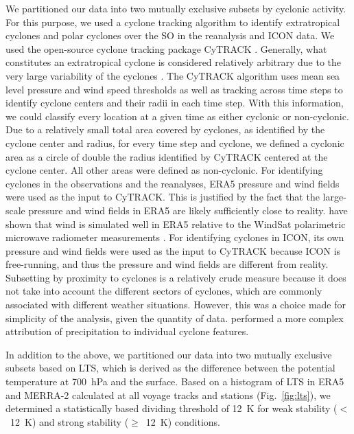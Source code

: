 \documentclass[draft]{agujournal2019}
\begin{document}
We partitioned our data into two mutually exclusive subsets by cyclonic activity. For this purpose, we used a cyclone tracking algorithm to identify extratropical cyclones and polar cyclones over the SO in the reanalysis and ICON data. We used the open-source cyclone tracking package CyTRACK \cite{perez-alarcon2024}. Generally, what constitutes an extratropical cyclone is considered relatively arbitrary due to the very large variability of the cyclones \cite{neu2013}. The CyTRACK algorithm uses mean sea level pressure and wind speed thresholds as well as tracking across time steps to identify cyclone centers and their radii in each time step. With this information, we could classify every location at a given time as either cyclonic or non-cyclonic. Due to a relatively small total area covered by cyclones, as identified by the cyclone center and radius, for every time step and cyclone, we defined a cyclonic area as a circle of double the radius identified by CyTRACK centered at the cyclone center. All other areas were defined as non-cyclonic. For identifying cyclones in the observations and the reanalyses, ERA5 pressure and wind fields were used as the input to CyTRACK. This is justified by the fact that the large-scale pressure and wind fields in ERA5 are likely sufficiently close to reality.  have shown that wind is simulated well in ERA5 relative to the WindSat polarimetric microwave radiometer measurements \cite{meissner2009}. For identifying cyclones in ICON, its own pressure and wind fields were used as the input to CyTRACK because ICON is free-running, and thus the pressure and wind fields are different from reality. Subsetting by proximity to cyclones is a relatively crude measure because it does not take into account the different sectors of cyclones, which are commonly associated with different weather situations. However, this was a choice made for simplicity of the analysis, given the quantity of data.  performed a more complex attribution of precipitation to individual cyclone features.

In addition to the above, we partitioned our data into two mutually exclusive subsets based on LTS, which is derived as the difference between the potential temperature at 700~hPa and the surface. Based on a histogram of LTS in ERA5 and MERRA-2 calculated at all voyage tracks and stations (Fig.~\ref{fig:lts}), we determined a statistically based dividing threshold of 12~K for weak stability ($<$~12~K) and strong stability ($\geq$~12~K) conditions.
\end{document}
